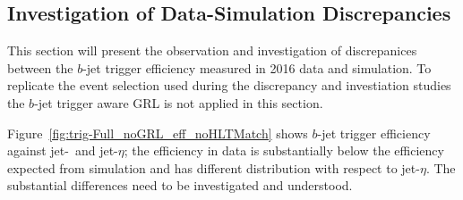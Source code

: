 \subsection{Investigation of Data-Simulation Discrepancies}
\label{sec:trig-inv}

This section will present the observation and investigation of discrepanices between the $b$-jet trigger efficiency measured in 2016 data and simulation.
To replicate the event selection used during the discrepancy and investiation studies the $b$-jet trigger aware GRL is not applied in this section.

Figure~\ref{fig:trig-Full_noGRL_eff_noHLTMatch} shows $b$-jet trigger efficiency against jet-\pT~and jet-$\eta$;
the efficiency in data is substantially below the efficiency expected from  simulation and has different distribution with respect to jet-$\eta$.
The substantial differences need to be investigated and understood. 

